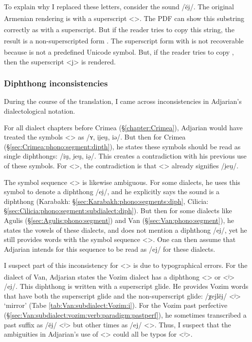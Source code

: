 To explain why I replaced these letters, consider the sound /ĕi̯/. The original Armenian rendering is \textsuperscript{} with a superscript <>. The PDF can show this substring correctly as \textsuperscript{}  with a superscript.  But if the reader tries to copy this string, the result is a non-superscripted form  . The superscript form with \textsuperscript{} is not recoverable because \textsuperscript{}  is not a predefined Unicode symbol. But, if the reader tries to copy 		, then the superscript <j> is rendered. 


\subsubsection{Diphthong inconsistencies}\label{sec:HossepIntro:phonotransc:adjerror}

During the course of the translation, I came across inconsistencies in Adjarian's dialectological notation. 

For all dialect chapters before Crimea (\S\ref{chapter:Crimea}), Adjarian would have treated the symbols <> as  /ʏ, ii̯eu̯, iə/. But then for Crimea (\S\ref{sec:Crimea:phono:segment:dipth}), he states these symbols should be read as single diphthongs: /iu̯, i̯eu̯,  iə̯/. This creates a contradiction with his previous use of these symbols. For <>, the contradiction is that <> already signifies /i̯eu̯/. 


The symbol sequence <> is likewise ambiguous. For some dialects, he uses this symbol to denote a diphthong /ei̯/, and he explicitly says the sound is a diphthong (Karabakh: \S\ref{sec:Karabakh:phono:segments:diph}, Cilicia: \S\ref{sec:Cilicia:phono:segment:subdialect:diph}). But then for some dialects like Agulis (\S\ref{sec:Agulis:phono:segment}) and Van (\S\ref{sec:Van:phono:segment}), he states the vowels of these dialects, and does not mention a diphthong /ei̯/, yet he still provides words with the symbol sequence <>. One can then assume that Adjarian intends for this sequence to be read as /ej/ for these dialects.  

I suspect part of this inconsistency for <> is due to typographical errors. For the dialect of Van, Adjarian states the Vozim dialect has a diphthong <\textsuperscript{}> or <ʲ> /ei̯/. This diphthong is written with a superscript glide. He provides Vozim words that have both the superscript glide and the non-superscript glide: /χejlĕi̯/ <ʲ> `mirror' (Tabe \ref{tab:Van:subdialect:Vozim:i}).   For the Vozim past perfective (\S\ref{sec:Van:subdialect:vozim:verb:paradigm:pastperf}), he sometimes transcribed a past suffix as /ĕi̯/ <ʲ> but other times as /ej/ <>. Thus, I suspect that the ambiguities in Adjarian's use of <> could all be typos for <ʲ>. 


